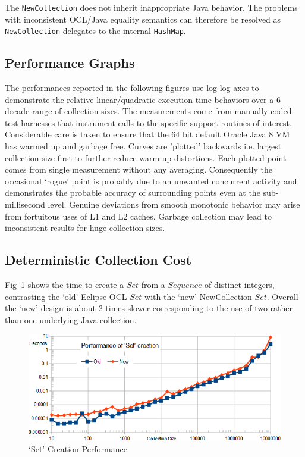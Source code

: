 \documentclass{llncs}
\begin{document}
The \verb$NewCollection$ does not inherit inappropriate Java behavior. The problems with inconsistent OCL/Java equality semantics can therefore be resolved as \verb$NewCollection$ delegates to the internal \verb$HashMap$.

\subsection{Performance Graphs}

The performances reported in the following figures use log-log axes to demonstrate the relative linear/quadratic execution time behaviors over a 6 decade range of collection sizes. The measurements come from manually coded test harnesses that instrument calls to the specific support routines of interest. Considerable care is taken to ensure that the 64 bit default Oracle Java 8 VM has warmed up and garbage free. Curves are 'plotted' backwards i.e. largest collection size first to further reduce warm up distortions. Each plotted point comes from single measurement without any averaging. Consequently the occasional `rogue' point is probably due to an unwanted concurrent activity and demonstrates the probable accuracy of surrounding points even at the sub-millisecond level. Genuine deviations from smooth monotonic behavior may arise from fortuitous uses of L1 and L2 caches. Garbage collection may lead to inconsistent results for huge collection sizes. 

\subsection{Deterministic Collection Cost}

Fig~\ref{fig:SetCreatePerformance} shows the time to create a $Set$ from a $Sequence$ of distinct integers, contrasting the `old' Eclipse OCL $Set$ with the `new' NewCollection $Set$. Overall the `new' design is about 2 times slower corresponding to the use of two rather than one underlying Java collection.

\begin{figure}
	\begin{center}
		\includegraphics[width=4.5in]{SetCreatePerformance.png}
	\end{center}
	\caption{`Set' Creation Performance}
	\label{fig:SetCreatePerformance}
\end{figure}
\end{document}
